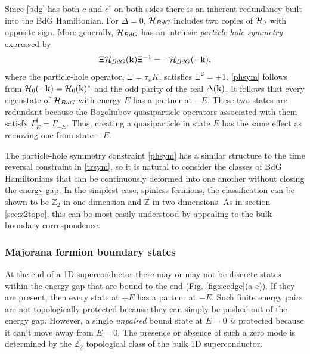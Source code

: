 \documentclass[twocolumn,floatfix,showpacs,rmp,aps]{revtex4}
\begin{document}
	Since \eqref{bdg} has both $c$ and $c^\dagger$ on both sides there is
	an inherent redundancy built into the BdG Hamiltonian.  For
	$\Delta=0$, ${\cal H}_{BdG}$ includes
	two copies of ${\cal H}_0$ with opposite sign.  More generally, ${\cal H}_{BdG}$
	has an intrinsic {\it particle-hole symmetry} expressed by
	\begin{equation}
		\Xi {\cal H}_{BdG}({\bf k}) \Xi^{-1} = - {\cal H}_{BdG}(-{\bf k}),
		\label{phsym}
	\end{equation}
	where the particle-hole operator, $\Xi = \tau_x K$,
	satisfies $\Xi^2 = +1$.  \eqref{phsym} follows from ${\cal H}_0(-{\bf k})={\cal H}_0({\bf k})^*$
	and the odd parity of the real $\Delta({\bf k})$.  It follows that every
	eigenstate of ${\cal H}_{BdG}$ with energy $E$ has a partner at
	$-E$.  These two states are redundant because the
	Bogoliubov quasiparticle operators associated with them satisfy
	$\Gamma_E^\dagger = \Gamma_{-E}$.  Thus, creating a quasiparticle in state
	$E$ has the same effect as removing one from state $-E$.
	
	The particle-hole symmetry constraint \eqref{phsym} has a similar
	structure to the time reversal constraint in \eqref{trsym}, so it is
	natural to consider the classes of BdG Hamiltonians that
	can be continuously deformed into one another without closing the
	energy gap.  In the simplest case, spinless fermions, the classification
	can be shown to be $\mathbb{Z}_2$
	in one dimension and $\mathbb{Z}$ in two dimensions.
	As in section \ref{sec:z2topo}, this can be most easily understood by appealing to
	the bulk-boundary correspondence.
	
	\subsubsection{Majorana fermion boundary states}
	\label{sec:majoranaedge}
	
	At the end of a 1D superconductor \cite{kitaev00} there may or may not
	be discrete states within the energy gap that are bound to the end
	(Fig. \ref{fig:scedge}(a-c)).
	If they are present, then every state at $+E$ has a partner at
	$-E$.  Such finite energy pairs are not topologically protected
	because they can simply be pushed out of the energy gap.  However,
	a single {\it unpaired} bound state at $E=0$ {\it is} protected because it can't move away
	from $E=0$.  The presence or absence of such a zero mode is determined by the
	$\mathbb{Z}_2$ topological class of the bulk 1D superconductor.
	
\end{document}

